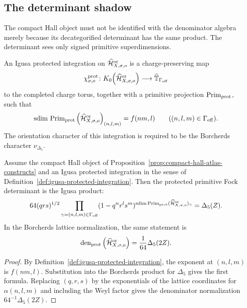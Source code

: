 \subsection{The determinant shadow}

The compact Hall object must not be identified with the denominator
algebra merely because its decategorified determinant has the same
product.  The determinant sees only signed primitive superdimensions.

\begin{definition}
\label{def:igusa-protected-integration}
An Igusa protected integration on
\(\widehat{\mathcal H}^{\mathrm{or}}_{X,\sigma,o}\) is a charge-preserving map
\[
  \chi^{\mathrm{prot}}_{\sigma,o}\colon
  K_0\!\left(\widehat{\mathcal H}^{\mathrm{or}}_{X,\sigma,o}\right)
  \longrightarrow
  \widehat{\mathbb T}_{\Gamma_{\mathrm{eff}}}
\]
to the completed charge torus, together with a primitive projection
\(\operatorname{Prim}_{\mathrm{prot}}\), such that
\[
  \operatorname{sdim}\,
  \operatorname{Prim}_{\mathrm{prot}}
  \left(\widehat{\mathcal H}^{\mathrm{or}}_{X,\sigma,o}\right)_{(n,l,m)}
  =
  f(nm,l)
  \qquad
  ((n,l,m)\in\Gamma_{\mathrm{eff}}).
\]
The orientation character of this integration is required to be the
Borcherds character \(\nu_{\Delta_5}\).
\end{definition}

\begin{proposition}
\label{prop:compact-hall-determinant-shadow}
Assume the compact Hall object of
Proposition~\ref{prop:compact-hall-atlas-constructs} and an Igusa
protected integration in the sense of
Definition~\ref{def:igusa-protected-integration}.  Then the protected
primitive Fock determinant is the Igusa product:
\[
  64(qrs)^{1/2}
  \prod_{\gamma=(n,l,m)\in\Gamma_{\mathrm{eff}}}
  (1-q^n r^l s^m)^{
  \operatorname{sdim}\operatorname{Prim}_{\mathrm{prot}}(\widehat{\mathcal H}^{\mathrm{or}}_{X,\sigma,o})_\gamma}
  =
  \Delta_5(Z).
\]
In the Borcherds lattice normalization, the same statement is
\[
  \operatorname{den}_{\mathrm{prot}}
  \left(\widehat{\mathcal H}^{\mathrm{or}}_{X,\sigma,o}\right)
  =
  \frac1{64}\Delta_5(2Z).
\]
\end{proposition}

\begin{proof}
By Definition~\ref{def:igusa-protected-integration}, the exponent at
\((n,l,m)\) is \(f(nm,l)\).  Substitution into the Borcherds product for
\(\Delta_5\) gives the first formula.  Replacing \((q,r,s)\) by the
exponentials of the lattice coordinates for \(\alpha(n,l,m)\) and
including the Weyl factor gives the denominator normalization
\(64^{-1}\Delta_5(2Z)\).
\end{proof}


